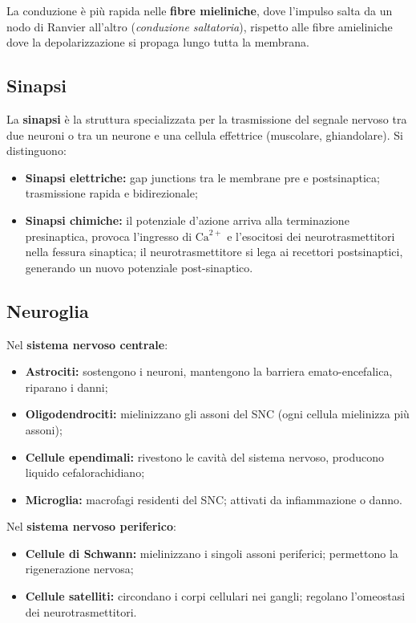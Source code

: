 \documentclass[11pt,a4paper,openright,twoside]{book}
\theoremstyle{definition}
\theoremstyle{plain}
\theoremstyle{remark}
\newcommand{\Ca}{\ensuremath{\text{Ca}^{2+}}}
\begin{document}
La conduzione è più rapida nelle \textbf{fibre mieliniche}, dove l'impulso salta da un nodo di Ranvier all'altro (\textit{conduzione saltatoria}), rispetto alle fibre amieliniche dove la depolarizzazione si propaga lungo tutta la membrana.

\subsection{Sinapsi}

La \textbf{sinapsi} è la struttura specializzata per la trasmissione del segnale nervoso tra due neuroni o tra un neurone e una cellula effettrice (muscolare, ghiandolare). Si distinguono:

\begin{itemize}
  \item \textbf{Sinapsi elettriche:} gap junctions tra le membrane pre e postsinaptica; trasmissione rapida e bidirezionale;
  \item \textbf{Sinapsi chimiche:} il potenziale d'azione arriva alla terminazione presinaptica, provoca l'ingresso di \Ca{} e l'esocitosi dei neurotrasmettitori nella fessura sinaptica; il neurotrasmettitore si lega ai recettori postsinaptici, generando un nuovo potenziale post-sinaptico.
\end{itemize}

\subsection{Neuroglia}

Nel \textbf{sistema nervoso centrale}:
\begin{itemize}
  \item \textbf{Astrociti:} sostengono i neuroni, mantengono la barriera emato-encefalica, riparano i danni;
  \item \textbf{Oligodendrociti:} mielinizzano gli assoni del SNC (ogni cellula mielinizza più assoni);
  \item \textbf{Cellule ependimali:} rivestono le cavità del sistema nervoso, producono liquido cefalorachidiano;
  \item \textbf{Microglia:} macrofagi residenti del SNC; attivati da infiammazione o danno.
\end{itemize}

Nel \textbf{sistema nervoso periferico}:
\begin{itemize}
  \item \textbf{Cellule di Schwann:} mielinizzano i singoli assoni periferici; permettono la rigenerazione nervosa;
  \item \textbf{Cellule satelliti:} circondano i corpi cellulari nei gangli; regolano l'omeostasi dei neurotrasmettitori.
\end{itemize}

\backmatter

\cleardoublepage
{}
{}
\end{document}
